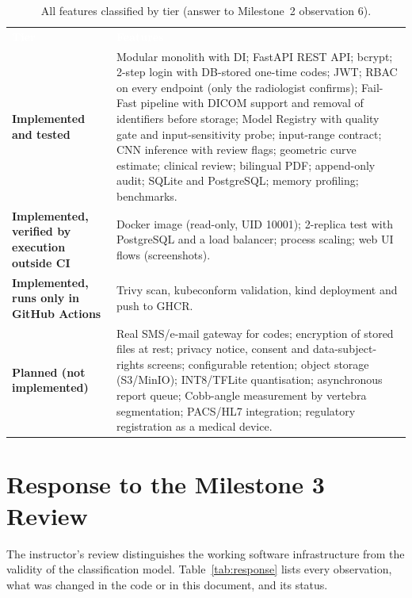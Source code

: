 \documentclass[12pt,a4paper]{article}
\newcommand{\hd}[1]{\textcolor{white}{\textbf{#1}}}
\begin{document}
\begin{table}[H]
\centering
\caption{All features classified by tier (answer to Milestone~2 observation 6).}
\label{tab:tiers}
\renewcommand{\arraystretch}{1.3}
\begin{tabularx}{\textwidth}{L{3.3cm} Y}
\hd{Tier} & \hd{Features} \\
\textbf{Implemented and tested} & Modular monolith with DI; FastAPI REST API; bcrypt; 2-step login with DB-stored one-time codes; JWT; RBAC on every endpoint (only the radiologist confirms); Fail-Fast pipeline with DICOM support and removal of identifiers before storage; Model Registry with quality gate and input-sensitivity probe; input-range contract; CNN inference with review flags; geometric curve estimate; clinical review; bilingual PDF; append-only audit; SQLite and PostgreSQL; memory profiling; benchmarks. \\
\textbf{Implemented, verified by execution outside CI} & Docker image (read-only, UID 10001); 2-replica test with PostgreSQL and a load balancer; process scaling; web UI flows (screenshots). \\
\textbf{Implemented, runs only in GitHub Actions} & Trivy scan, kubeconform validation, kind deployment and push to GHCR. \\
\textbf{Planned (not implemented)} & Real SMS/e-mail gateway for codes; encryption of stored files at rest; privacy notice, consent and data-subject-rights screens; configurable retention; object storage (S3/MinIO); INT8/TFLite quantisation; asynchronous report queue; Cobb-angle measurement by vertebra segmentation; PACS/HL7 integration; regulatory registration as a medical device. \\
\end{tabularx}
\end{table}

\section{Response to the Milestone 3 Review}
\label{sec:response}

The instructor's review distinguishes the working software infrastructure from the validity of the classification model. Table~\ref{tab:response} lists every
observation, what was changed in the code or in this document, and its status.
\end{document}
